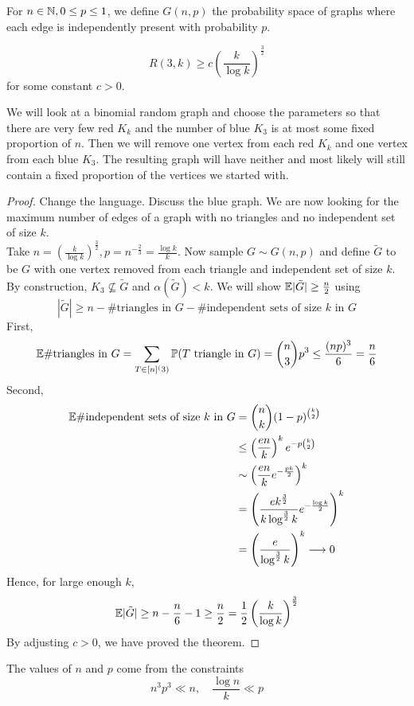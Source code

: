 \documentclass{article}
\begin{document}
\begin{dfn}
  For $n \in \mathbb N, 0 \le p \le 1$, we define $G(n, p)$ the probability space of graphs where each edge is independently present with probability $p$.
\end{dfn}

\begin{thm}[Erd\H os]
  $$R(3, k) \ge c\left(\frac k{\log k}\right)^{\frac 32}$$
  for some constant $c > 0$.
\end{thm}
\begin{idea}
  We will look at a binomial random graph and choose the parameters so that there are very few red $K_k$ and the number of blue $K_3$ is at most some fixed proportion of $n$. Then we will remove one vertex from each red $K_k$ and one vertex from each blue $K_3$. The resulting graph will have neither and most likely will still contain a fixed proportion of the vertices we started with.
\end{idea}
\begin{proof}
  Change the language. Discuss the blue graph. We are now looking for the maximum number of edges of a graph with no triangles and no independent set of size $k$. \\
  Take $n = \left(\frac k{\log k}\right)^{\frac 32}, p = n^{-\frac 23} = \frac{\log k}k$. Now sample $G \sim G(n, p)$ and define $\tilde G$ to be $G$ with one vertex removed from each triangle and independent set of size $k$. By construction, $K_3 \not\subseteq \tilde G$ and $\alpha(\tilde G) < k$. We will show $\mathbb E |\tilde G| \ge \frac n2$ using
  $$|\tilde G| \ge n - \#\text{triangles in } G - \#\text{independent sets of size $k$ in } G$$
  First,
  $$\mathbb E \#\text{triangles in } G
  = \sum_{T \in [n]^(3)} \mathbb P(T \text { triangle in } G)
  = \binom n3 p^3 \le \frac{(np)^3}6 = \frac n6$$
  Second,
  \begin{align*}
    \mathbb E \#\text{independent sets of size $k$ in } G
    & = \binom nk (1 - p)^{\binom k2} \\
    & \le \left(\frac{en}k\right)^k e^{-p\binom k2} \\
    & \sim \left(\frac{en}k e^{-\frac{pk}2}\right)^k \\
    & = \left(\frac{ek^{\frac 32}}{k\log^{\frac 32} k} e^{-\frac{\log k}2}\right)^k \\
    & = \left(\frac e{\log^{\frac 32} k}\right)^k \longrightarrow 0
  \end{align*}
  Hence, for large enough $k$,
  $$\mathbb E |\tilde G| \ge n - \frac n6 - 1 \ge \frac n2 = \frac 12 \left(\frac k{\log k}\right)^{\frac 32}$$
  By adjusting $c > 0$, we have proved the theorem.
\end{proof}
\begin{rmk}
  The values of $n$ and $p$ come from the constraints
  $$n^3p^3 \ll n, \quad \frac{\log n}k \ll p$$
\end{rmk}
\end{document}
